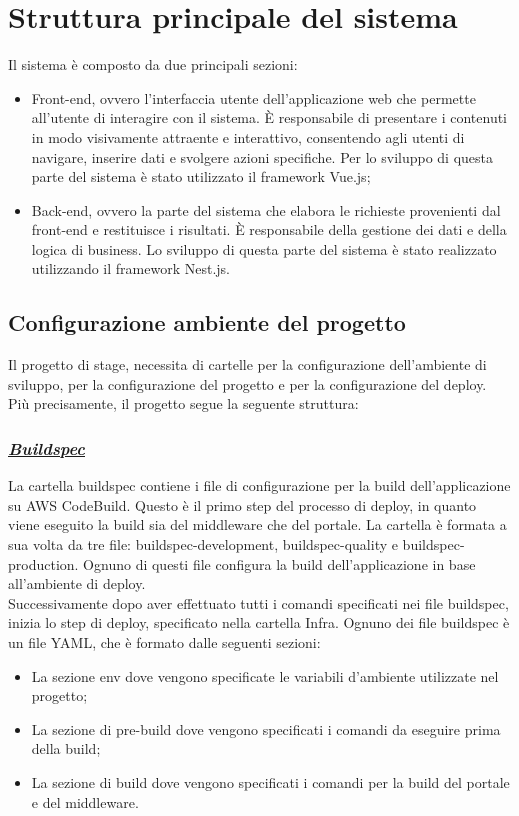 \section{Struttura principale del sistema}
Il sistema è composto da due principali sezioni:
\begin{itemize}
  \item Front-end, ovvero l'interfaccia utente dell'applicazione web che permette all'utente di interagire con il sistema. È responsabile di presentare i contenuti in modo visivamente attraente e interattivo, consentendo agli utenti di navigare, inserire dati e svolgere azioni specifiche. Per lo
  sviluppo di questa parte del sistema è stato utilizzato il framework Vue.js;
  \item Back-end, ovvero la parte del sistema che elabora le richieste provenienti dal front-end e restituisce i risultati. È responsabile della gestione dei dati e della logica di business.
  Lo sviluppo di questa parte del sistema è stato realizzato utilizzando il framework Nest.js. 
\end{itemize}

\subsection{Configurazione ambiente del progetto}
Il progetto di stage, necessita di cartelle per la configurazione dell'ambiente di sviluppo, per la configurazione del progetto e per la configurazione del deploy.
Più precisamente, il progetto segue la seguente struttura:

\subsubsection*{\normalsize\textit{\uline{Buildspec}}}
La cartella buildspec contiene i file di configurazione per la build dell'applicazione su AWS CodeBuild.
Questo è il primo step del processo di deploy, in quanto viene eseguito la build sia del middleware che del portale.
La cartella è formata a sua volta da tre file: buildspec-development, buildspec-quality e buildspec-production. 
Ognuno di questi file configura la build dell'applicazione in base all'ambiente di deploy.\\
Successivamente dopo aver effettuato tutti i comandi specificati nei file buildspec, inizia lo step di deploy, specificato nella cartella Infra.
Ognuno dei file buildspec è un file YAML, che è formato dalle seguenti sezioni:
\begin{itemize}
  \item La sezione env dove vengono specificate le variabili d'ambiente utilizzate nel progetto;
  \item La sezione di pre-build dove vengono specificati i comandi da eseguire prima della build;
  \item La sezione di build dove vengono specificati i comandi per la build del portale e del middleware.
\end{itemize}

